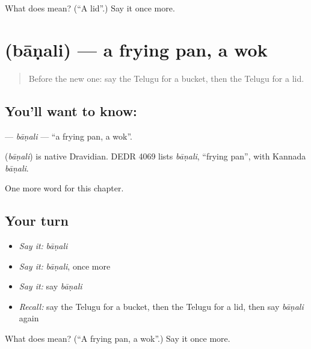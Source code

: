 \begin{tcolorbox}[breakable,colback=teal!4,colframe=teal!35!black,title={Before you move on}]
What does  mean? (\textquotedblleft{}A lid\textquotedblright{}.) Say it once more.
\end{tcolorbox}
\section[\texorpdfstring{\te{బాణలి} (bāṇali)}{బాణలి (bāṇali)}]{ (bāṇali) — a frying pan, a wok}

\label{lesson:TE-C183-banali}



\begin{quote}
Before the new one: say the Telugu for a bucket, then the Telugu for a lid.
\end{quote}

\subsection*{You'll want to know: }
\textbf{} — \emph{bāṇali} — \textquotedblleft{}a frying pan, a wok\textquotedblright{}.

\begin{cousinweb}
\textbf{} (\emph{bāṇali}) is native Dravidian. DEDR 4069 lists \emph{bāṇali}, \textquotedblleft{}frying pan\textquotedblright{}, with Kannada \emph{bāṇali}.
\end{cousinweb}

\begin{grammarlens}[title={What you've built}]
One more word for this chapter.
\end{grammarlens}

\subsection*{Your turn}
\begin{itemize}
\raggedright
  \item \emph{Say it:} \emph{bāṇali}
  \item \emph{Say it:} \emph{bāṇali}, once more
  \item \emph{Say it:} say \emph{bāṇali}
  \item \emph{Recall:} say the Telugu for a bucket, then the Telugu for a lid, then say \emph{bāṇali} again
\end{itemize}

\begin{tcolorbox}[breakable,colback=teal!4,colframe=teal!35!black,title={Before you move on}]
What does  mean? (\textquotedblleft{}A frying pan, a wok\textquotedblright{}.) Say it once more.
\end{tcolorbox}
